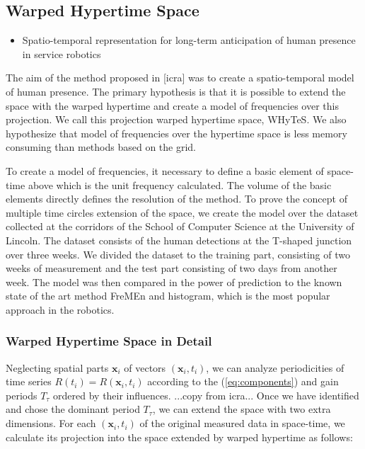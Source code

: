 \subsection{Warped Hypertime Space}

\begin{itemize}
    \item Spatio-temporal representation for long-term anticipation of human presence in service robotics
\end{itemize}

The aim of the method proposed in [icra] was to create a spatio-temporal model of human presence. 
The primary hypothesis is that it is possible to extend the space with the warped hypertime and create a model of frequencies over this projection.
We call this projection warped hypertime space, WHyTeS. 
We also hypothesize that model of frequencies over the hypertime space is less memory consuming than methods based on the grid.

To create a model of frequencies, it necessary to define a basic element of space-time above which is the unit frequency calculated. 
The volume of the basic elements directly defines the resolution of the method.
To prove the concept of multiple time circles extension of the space, we create the model over the dataset collected at the corridors of the School of Computer Science at the University of Lincoln.
The dataset consists of the human detections at the T-shaped junction over three weeks.
We divided the dataset to the training part, consisting of two weeks of measurement and the test part consisting of two days from another week.
The model was then compared in the power of prediction to the known state of the art method FreMEn and histogram, which is the most popular approach in the robotics.

\subsubsection{Warped Hypertime Space in Detail}

Neglecting spatial parts $\mathbf{x}_{i}$ of vectors $\left(\mathbf{x}_i, t_i\right)$, we can analyze periodicities of time series $R\left(t_{i}\right) = R\left(\mathbf{x}_i, t_i\right)$ according to the (\ref{eq:components}) and gain periods $T_{\tau}$ ordered by their influences.
...copy from icra...
Once we have identified and chose the dominant period $T_{\tau}$, we can extend the space with two extra dimensions.
For each $\left(\mathbf{x}_i, t_i\right)$ of the original measured data in space-time, we calculate its projection into the space extended by warped hypertime as follows:

